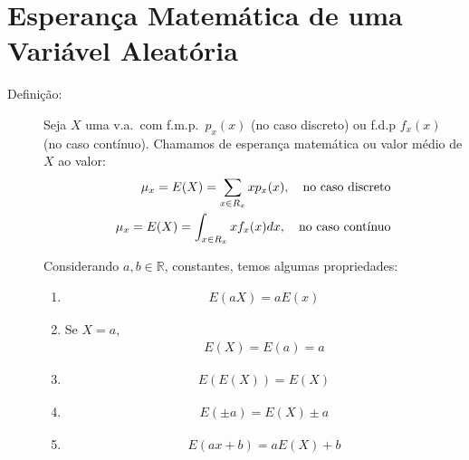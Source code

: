      \section{Esperança Matemática de uma Variável Aleatória}
     \begin{description}
       \item [Definição:] Seja $X$ uma v.a.\ com f.m.p.\ $p_{x}(x)$ (no caso discreto) ou f.d.p
         $f_{x}(x)$ (no caso contínuo). Chamamos de esperança matemática ou valor médio 
         de $X$ ao valor: 
         \begin{align}
           \mu_{x}= E(X)= \sum \limits_{x \in R_{x}} x p_{x}(x) , 
           \text{\quad no caso discreto}\\
           \mu_{x}= E(X)= \int_{x \in R_{x}} x f_{x}(x)dx, \text{\quad no caso contínuo}
         \end{align}

         Considerando $a,b \in \mathbb{R}$, constantes, temos  algumas propriedades:

         \begin{enumerate}[label=(\alph*)]
           \item 
             \begin{align}
               E(aX)=aE(x)
             \end{align}
           \item Se $X=a$, 
             \begin{align}
               E(X)=E(a)=a
             \end{align}
           \item 
           \begin{align}    E(E(X))= E(X)\end{align}
           \item 
           \begin{align}  E(\pm a)=E(X)\pm a\end{align}
\item 
\begin{align}  E(ax + b)=aE(X)+ b\end{align}


\end{enumerate}
\end{description}
